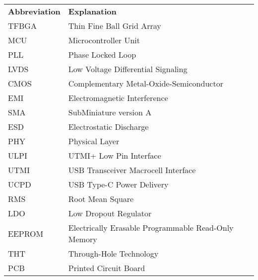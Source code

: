 \documentclass[twoside]{ctuthesis}
\theoremstyle{plain}
\theoremstyle{definition}
\theoremstyle{note}
\begin{document}
\newpage
\begin{tabularx}{\linewidth}
	{ l >{\raggedright\arraybackslash}X }
	\bfseries Abbreviation & \bfseries Explanation\\\Midrule
	TFBGA & Thin Fine Ball Grid Array\\
	MCU & Microcontroller Unit\\
	PLL & Phase Locked Loop\\
	LVDS & Low Voltage Differential Signaling\\
	CMOS & Complementary Metal-Oxide-Semiconductor\\
	EMI & Electromagnetic Interference\\
	SMA & SubMiniature version A\\
	ESD & Electrostatic Discharge\\
	PHY & Physical Layer\\
	ULPI & UTMI+ Low Pin Interface\\
	UTMI & USB Transceiver Macrocell Interface\\
	UCPD & USB Type-C Power Delivery\\
	RMS & Root Mean Square\\
	LDO & Low Dropout Regulator\\
	EEPROM & Electrically Erasable Programmable Read-Only Memory\\
	THT & Through-Hole Technology\\
	PCB & Printed Circuit Board\\
\end{tabularx}
\end{document}
